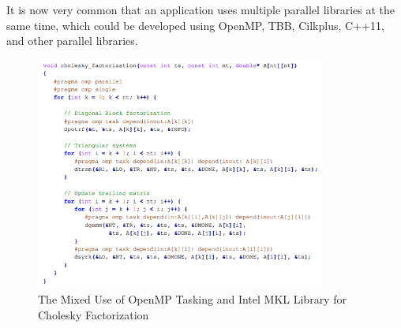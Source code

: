 It is now very common that an application uses multiple parallel libraries at the same time, which could be developed 
using OpenMP, TBB, Cilkplus, C++11, and other parallel libraries. 

\begin{figure}[h!]
  \centering
      \includegraphics[width=0.85\textwidth]{images/cholesky}
      \caption{The Mixed Use of OpenMP Tasking and Intel MKL Library for Cholesky Factorization~\cite{intertwine}}
 \label{fig:cholesky}
\end{figure}
